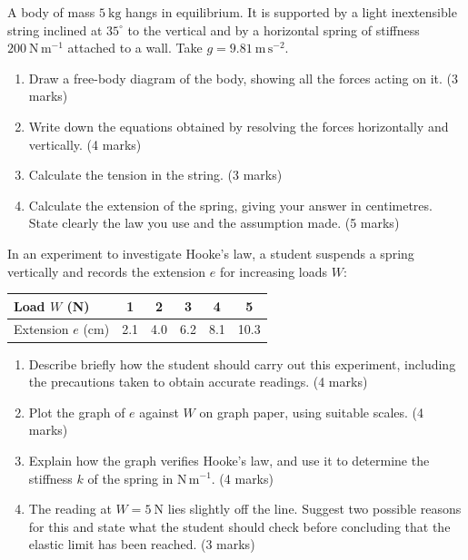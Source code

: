\documentclass[11pt]{article}
\begin{document}
\begin{exercice}
A body of mass $5\ \mathrm{kg}$ hangs in equilibrium. It is supported by a light inextensible string inclined at $35^{\circ}$ to the vertical and by a horizontal spring of stiffness $200\ \mathrm{N\,m^{-1}}$ attached to a wall. Take $g = 9.81\ \mathrm{m\,s^{-2}}$.
\begin{enumerate}
\item Draw a free-body diagram of the body, showing all the forces acting on it. \hfill (3 marks)
\item Write down the equations obtained by resolving the forces horizontally and vertically. \hfill (4 marks)
\item Calculate the tension in the string. \hfill (3 marks)
\item Calculate the extension of the spring, giving your answer in centimetres. State clearly the law you use and the assumption made. \hfill (5 marks)
\end{enumerate}
\end{exercice}

\begin{exercice}
In an experiment to investigate Hooke's law, a student suspends a spring vertically and records the extension $e$ for increasing loads $W$:
\begin{center}
\begin{tabular}{|l|ccccc|}
\hline
\rowcolor{popblueL} Load $W$ (N) & 1 & 2 & 3 & 4 & 5 \\
\hline
Extension $e$ (cm) & 2.1 & 4.0 & 6.2 & 8.1 & 10.3 \\
\hline
\end{tabular}
\end{center}
\begin{enumerate}
\item Describe briefly how the student should carry out this experiment, including the precautions taken to obtain accurate readings. \hfill (4 marks)
\item Plot the graph of $e$ against $W$ on graph paper, using suitable scales. \hfill (4 marks)
\item Explain how the graph verifies Hooke's law, and use it to determine the stiffness $k$ of the spring in $\mathrm{N\,m^{-1}}$. \hfill (4 marks)
\item The reading at $W = 5\ \mathrm{N}$ lies slightly off the line. Suggest two possible reasons for this and state what the student should check before concluding that the elastic limit has been reached. \hfill (3 marks)
\end{enumerate}
\end{exercice}
\end{document}
